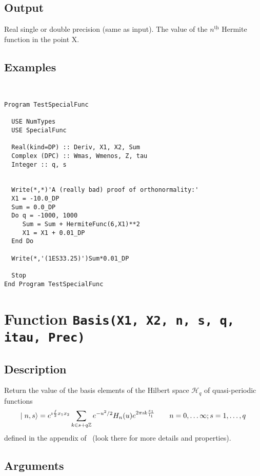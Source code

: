 \subsection{Output}

Real single or double precision (same as input). The value of the
$n^{\underline{\text{th}}}$ Hermite function in the point X.

\subsection{Examples}

\begin{verbatim}


Program TestSpecialFunc

  USE NumTypes
  USE SpecialFunc

  Real(kind=DP) :: Deriv, X1, X2, Sum
  Complex (DPC) :: Wmas, Wmenos, Z, tau
  Integer :: q, s


  Write(*,*)'A (really bad) proof of orthonormality:'
  X1 = -10.0_DP
  Sum = 0.0_DP
  Do q = -1000, 1000
     Sum = Sum + HermiteFunc(6,X1)**2
     X1 = X1 + 0.01_DP
  End Do

  Write(*,'(1ES33.25)')Sum*0.01_DP

  Stop
End Program TestSpecialFunc
\end{verbatim}

\section{Function \texttt{Basis(X1, X2, n, s, q, itau, Prec) }}

\subsection{Description}

Return the value of the basis elements of the Hilbert space $\mathcal
H_q$ of quasi-periodic functions
\begin{equation}
  \mid n,s \rangle = e^{\imath
    \frac{f}{2}x_1x_2} \sum_{k\in s + q\mathbb Z} 
  e^{-u^2/2}H_n(u)
  e^{2\pi\imath k\frac{x_1}{l_1}}\qquad n=0,\dots\infty;s=1,\dots,q
\end{equation}
defined in the appendix of~\cite{Gonzalez-Arroyo:2004xu} (look there
for more details and properties).

\subsection{Arguments}

